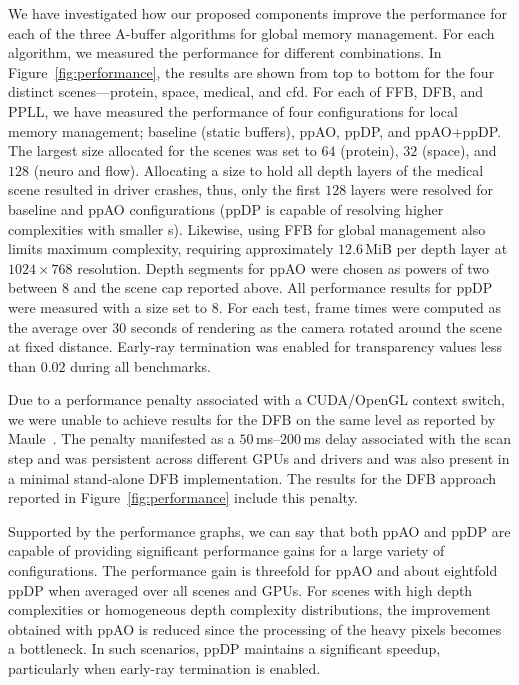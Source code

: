 \documentclass{egpubl}
\newcommand{\ab}{\mbox{A-buffer}}
\newcommand{\stencil}{ppAO}
\newcommand{\dloop}{ppDP}
\begin{document}
We have investigated how our proposed components improve the performance for each of the three \ab{} algorithms for global memory management. %
For each algorithm, we measured the performance for different combinations.
In Figure~\ref{fig:performance}, the results are shown from top to bottom for the four distinct scenes---protein, space, medical, and cfd.
For each of FFB, DFB, and PPLL, we have measured the performance of four configurations for local memory management; baseline (static buffers), \stencil{}, \dloop{}, and \stencil{}+\dloop{}. 
The largest \bArray{} size allocated for the scenes was set to $64$ (protein), $32$ (space), and $128$ (neuro and flow). 
Allocating a \bArray{} size to hold all depth layers of the medical scene resulted in driver crashes, thus, only the first $128$ layers were resolved for baseline and \stencil{} configurations (\dloop{} is capable of resolving higher complexities with smaller \bArray{}s). 
Likewise, using FFB for global management also limits maximum complexity, requiring approximately $12.6$\,MiB per depth layer at $1024 \times 768$ resolution. 
Depth segments for \stencil{} were chosen as powers of two between $8$ and the scene cap reported above. 
All performance results for \dloop{} were measured with a \bArray{} size set to $8$. 
For each test, frame times were computed as the average over $30$ seconds of rendering as the camera rotated around the scene at fixed distance. 
Early-ray termination was enabled for transparency values less than $0.02$ during all benchmarks.

Due to a performance penalty associated with a CUDA/OpenGL context switch, we were unable to achieve results for the DFB on the same level as reported by Maule~\cite{Maule2012}. 
The penalty manifested as a $50\,$ms--$200\,$ms delay associated with the scan step and was persistent across different GPUs and drivers and was also present in a minimal stand-alone DFB implementation.
The results for the DFB approach reported in Figure~\ref{fig:performance} include this penalty.

Supported by the performance graphs, we can say that both \stencil{} and \dloop{} are capable of providing significant performance gains for a large variety of configurations. 
The performance gain is threefold for \stencil{} and about eightfold \dloop{} when averaged over all scenes and GPUs. 
For scenes with high depth complexities or homogeneous depth complexity distributions, the improvement obtained with \stencil{} is reduced since the processing of the heavy pixels becomes a bottleneck. 
In such scenarios, \dloop{} maintains a significant speedup, particularly when early-ray termination is enabled. 
\end{document}
